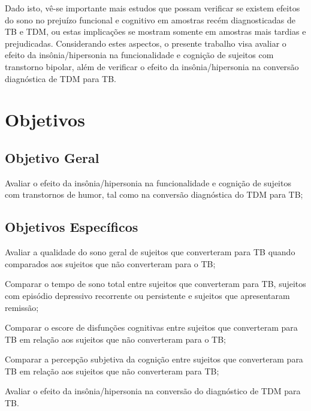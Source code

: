 \documentclass[chapter=TITLE,
               oneside,
               12pt,
               a4paper,
               english,
               brazil]{abntex2}    %
\begin{document}
    Dado isto, vê-se importante mais estudos que possam verificar se existem efeitos
    do sono no prejuízo funcional e cognitivo em amostras recém diagnosticadas
    de TB e TDM, ou estas implicações se mostram somente em amostras mais
    tardias e prejudicadas.
    Considerando estes aspectos, o presente trabalho visa avaliar o efeito da
    insônia/hipersonia na funcionalidade e cognição de sujeitos com transtorno
    bipolar, além de verificar o efeito da insônia/hipersonia na conversão
    diagnóstica de TDM para TB.

\vspace{\onelineskip}
\chapter{Objetivos}\label{sec:objetivos}

    \section{Objetivo Geral}\label{sec:geral}
    
        \begin{alineas}
    
            \item Avaliar o efeito da insônia/hipersonia na funcionalidade e
            cognição de sujeitos com transtornos de humor, tal como na
            conversão diagnóstica do TDM para TB;
    
        \end{alineas}
    
    \section{Objetivos Específicos}\label{sec:especifico}
    
        \begin{alineas}[resume]
    
            \item Avaliar a qualidade do sono geral de sujeitos que converteram para
            TB quando comparados aos sujeitos que não converteram para o TB;
    
            \item Comparar o tempo de sono total entre sujeitos que converteram para
            TB, sujeitos com episódio depressivo recorrente ou persistente e sujeitos
            que apresentaram remissão;
    
            \item Comparar o escore de disfunções cognitivas entre sujeitos que
            converteram para TB em relação aos sujeitos que não converteram
            para o TB;
    
            \item Comparar a percepção subjetiva da cognição entre sujeitos que
            converteram para TB em relação aos sujeitos que não converteram para TB;
    
            \item Avaliar o efeito da insônia/hipersonia na conversão do
            diagnóstico de TDM para TB.
    
        \end{alineas}
\end{document}
